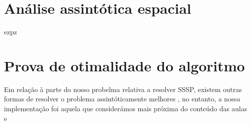 \documentclass{scrartcl}
\begin{document}
\section*{Análise assintótica espacial}
ezpz

\section*{Prova de otimalidade do algoritmo}
Em relação à parte do nosso probelma relativa a resolver SSSP, existem outras formas de resolver o problema assintóticamente melhores \cite{Raman:1997}, no entanto, a nossa implementação foi aquela que considerámos mais próxima do conteúdo das aulas e 

\end{document}
